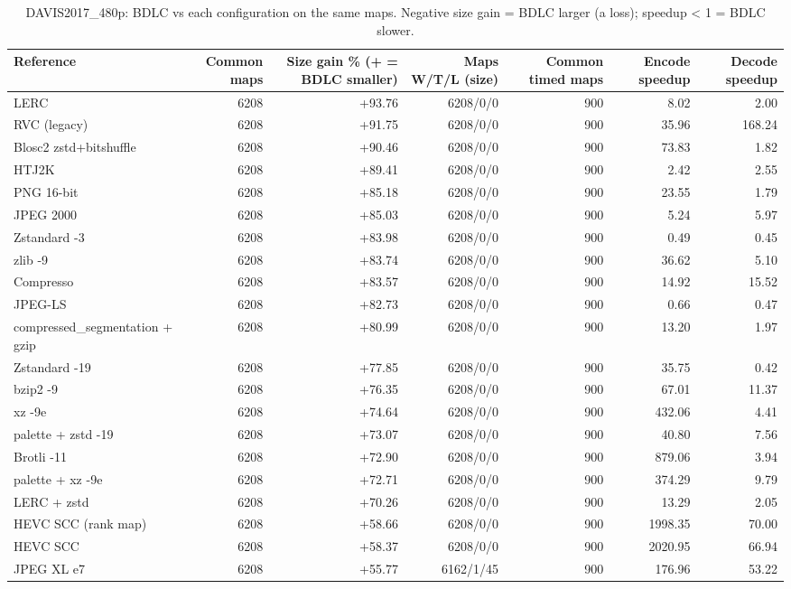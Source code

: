 \begin{table}[t]
\centering
\caption{DAVIS2017\_480p: BDLC vs each configuration on the same maps. Negative size gain = BDLC larger (a loss); speedup < 1 = BDLC slower.}
\begin{tabular}{lrrrrrr}
\hline
Reference & Common maps & Size gain \% (+ = BDLC smaller) & Maps W/T/L (size) & Common timed maps & Encode speedup & Decode speedup \\
\hline
LERC & 6208 & +93.76 & 6208/0/0 & 900 & 8.02 & 2.00 \\
RVC (legacy) & 6208 & +91.75 & 6208/0/0 & 900 & 35.96 & 168.24 \\
Blosc2 zstd+bitshuffle & 6208 & +90.46 & 6208/0/0 & 900 & 73.83 & 1.82 \\
HTJ2K & 6208 & +89.41 & 6208/0/0 & 900 & 2.42 & 2.55 \\
PNG 16-bit & 6208 & +85.18 & 6208/0/0 & 900 & 23.55 & 1.79 \\
JPEG 2000 & 6208 & +85.03 & 6208/0/0 & 900 & 5.24 & 5.97 \\
Zstandard -3 & 6208 & +83.98 & 6208/0/0 & 900 & 0.49 & 0.45 \\
zlib -9 & 6208 & +83.74 & 6208/0/0 & 900 & 36.62 & 5.10 \\
Compresso & 6208 & +83.57 & 6208/0/0 & 900 & 14.92 & 15.52 \\
JPEG-LS & 6208 & +82.73 & 6208/0/0 & 900 & 0.66 & 0.47 \\
compressed\_segmentation + gzip & 6208 & +80.99 & 6208/0/0 & 900 & 13.20 & 1.97 \\
Zstandard -19 & 6208 & +77.85 & 6208/0/0 & 900 & 35.75 & 0.42 \\
bzip2 -9 & 6208 & +76.35 & 6208/0/0 & 900 & 67.01 & 11.37 \\
xz -9e & 6208 & +74.64 & 6208/0/0 & 900 & 432.06 & 4.41 \\
palette + zstd -19 & 6208 & +73.07 & 6208/0/0 & 900 & 40.80 & 7.56 \\
Brotli -11 & 6208 & +72.90 & 6208/0/0 & 900 & 879.06 & 3.94 \\
palette + xz -9e & 6208 & +72.71 & 6208/0/0 & 900 & 374.29 & 9.79 \\
LERC + zstd & 6208 & +70.26 & 6208/0/0 & 900 & 13.29 & 2.05 \\
HEVC SCC (rank map) & 6208 & +58.66 & 6208/0/0 & 900 & 1998.35 & 70.00 \\
HEVC SCC & 6208 & +58.37 & 6208/0/0 & 900 & 2020.95 & 66.94 \\
JPEG XL e7 & 6208 & +55.77 & 6162/1/45 & 900 & 176.96 & 53.22 \\

\end{tabular}
\end{table}
